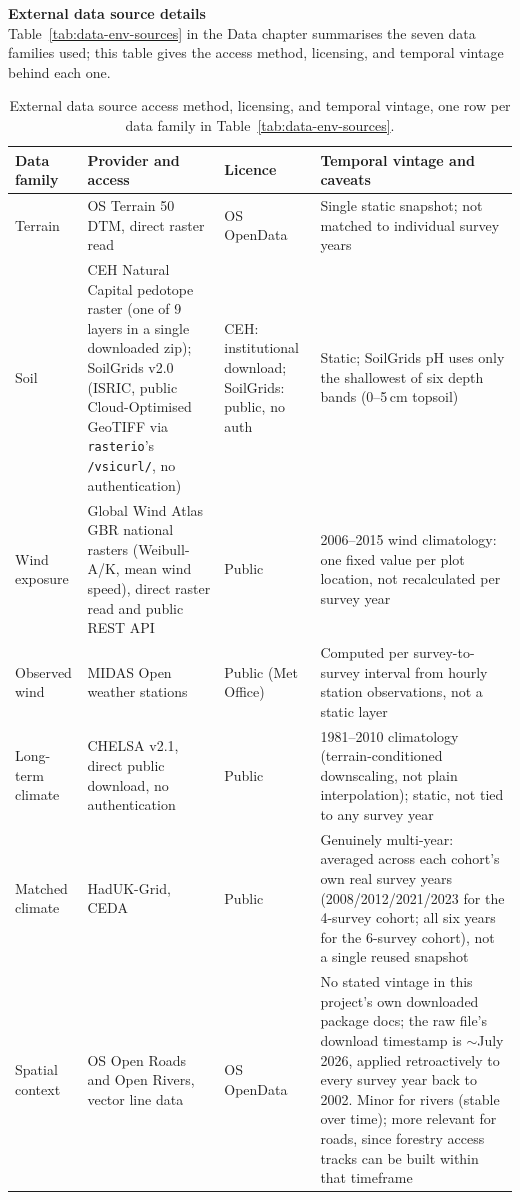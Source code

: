 \begin{table}[H]
\centering
\textbf{External data source details}\label{app:data-sources}\\[4pt]
{\small Table~\ref{tab:data-env-sources} in the Data chapter summarises the seven data families used; this table gives the access method, licensing, and temporal vintage behind each one.\\[6pt]}
\scriptsize
\setlength{\tabcolsep}{3pt}
\renewcommand{\arraystretch}{1.1}
\begin{tabular}{p{1.8cm}p{4.7cm}p{2.0cm}p{5.2cm}}
\hline
Data family & Provider and access & Licence & Temporal vintage and caveats \\
\hline
Terrain & OS Terrain 50 DTM, direct raster read & OS OpenData & Single static snapshot; not matched to individual survey years \\
Soil & CEH Natural Capital pedotope raster (one of 9 layers in a single downloaded zip); SoilGrids v2.0 (ISRIC, public Cloud-Optimised GeoTIFF via \texttt{rasterio}'s \texttt{/vsicurl/}, no authentication) & CEH: institutional download; SoilGrids: public, no auth & Static; SoilGrids pH uses only the shallowest of six depth bands (0--5\,cm topsoil) \\
Wind exposure & Global Wind Atlas GBR national rasters (Weibull-A/K, mean wind speed), direct raster read and public REST API & Public & 2006--2015 wind climatology: one fixed value per plot location, not recalculated per survey year \\
Observed wind & MIDAS Open weather stations & Public (Met Office) & Computed per survey-to-survey interval from hourly station observations, not a static layer \\
Long-term climate & CHELSA v2.1, direct public download, no authentication & Public & 1981--2010 climatology (terrain-conditioned downscaling, not plain interpolation); static, not tied to any survey year \\
Matched climate & HadUK-Grid, CEDA & Public & Genuinely multi-year: averaged across each cohort's own real survey years (2008/2012/2021/2023 for the 4-survey cohort; all six years for the 6-survey cohort), not a single reused snapshot \\
Spatial context & OS Open Roads and Open Rivers, vector line data & OS OpenData & No stated vintage in this project's own downloaded package docs; the raw file's download timestamp is $\sim$July 2026, applied retroactively to every survey year back to 2002. Minor for rivers (stable over time); more relevant for roads, since forestry access tracks can be built within that timeframe \\
\hline
\end{tabular}
\caption{External data source access method, licensing, and temporal vintage, one row per
data family in Table~\ref{tab:data-env-sources}.}
\label{tab:data-sources-detail}
\end{table}


